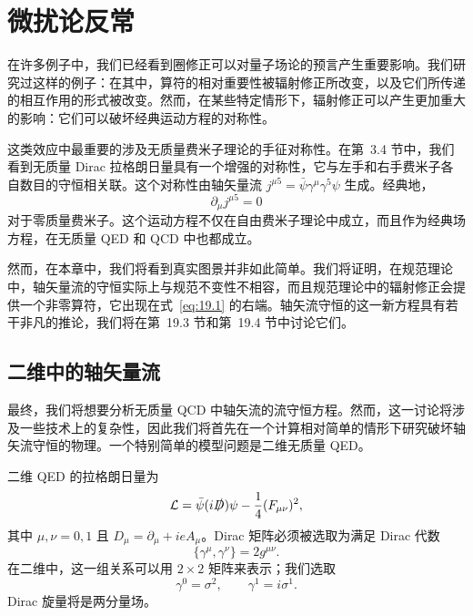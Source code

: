 \chapter{微扰论反常}

在许多例子中，我们已经看到圈修正可以对量子场论的预言产生重要影响。我们研究过这样的例子：在其中，算符的相对重要性被辐射修正所改变，以及它们所传递的相互作用的形式被改变。然而，在某些特定情形下，辐射修正可以产生更加重大的影响：它们可以破坏经典运动方程的对称性。

这类效应中最重要的涉及无质量费米子理论的手征对称性。在第~3.4 节中，我们看到无质量 Dirac 拉格朗日量具有一个增强的对称性，它与左手和右手费米子各自数目的守恒相关联。这个对称性由轴矢量流 $j^{\mu 5} = \bar{\psi}\gamma^\mu\gamma^5\psi$ 生成。经典地，
\begin{equation}
  \partial_\mu j^{\mu 5} = 0
  \label{eq:19.1}
\end{equation}
对于零质量费米子。这个运动方程不仅在自由费米子理论中成立，而且作为经典场方程，在无质量 QED 和 QCD 中也都成立。

然而，在本章中，我们将看到真实图景并非如此简单。我们将证明，在规范理论中，轴矢量流的守恒实际上与规范不变性不相容，而且规范理论中的辐射修正会提供一个非零算符，它出现在式~\eqref{eq:19.1} 的右端。轴矢流守恒的这一新方程具有若干非凡的推论，我们将在第~19.3 节和第~19.4 节中讨论它们。

\section{二维中的轴矢量流}

最终，我们将想要分析无质量 QCD 中轴矢流的流守恒方程。然而，这一讨论将涉及一些技术上的复杂性，因此我们将首先在一个计算相对简单的情形下研究破坏轴矢流守恒的物理。一个特别简单的模型问题是二维无质量 QED。

二维 QED 的拉格朗日量为
\begin{equation}
  \mathcal{L} = \bar{\psi}(i\slashed{D})\psi - \frac{1}{4}(F_{\mu\nu})^2 ,
  \label{eq:19.2}
\end{equation}
其中 $\mu, \nu = 0, 1$ 且 $D_\mu = \partial_\mu + ieA_\mu$。Dirac 矩阵必须被选取为满足 Dirac 代数
\begin{equation}
  \{\gamma^\mu, \gamma^\nu\} = 2g^{\mu\nu} .
  \label{eq:19.3}
\end{equation}
在二维中，这一组关系可以用 $2\times2$ 矩阵来表示；我们选取
\begin{equation}
  \gamma^0 = \sigma^2,\qquad \gamma^1 = i\sigma^1 .
  \label{eq:19.4}
\end{equation}
Dirac 旋量将是两分量场。

